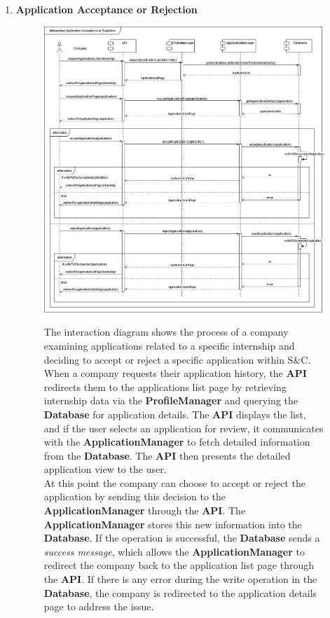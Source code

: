 \begin{enumerate}
    \newpage
    \item \textbf{Application Acceptance or Rejection}
    \begin{figure}[h!]
            \centering  \includegraphics[width=1\textwidth]{DD/Images/Interactions/INT14_ApplicationAcceptanceOrRejection.drawio.png}
            \label{fig:ComponentViewDiagram}
            \caption*{
                The interaction diagram shows the process of a company examining applications related to a specific internship and deciding to accept or reject a specific application within S\&C. When a company requests their application history, the \textbf{API} redirects them to the applications list page by retrieving internship data via the \textbf{ProfileManager} and querying the \textbf{Database} for application details. The \textbf{API} displays the list, and if the user selects an application for review, it communicates with the \textbf{ApplicationManager} to fetch detailed information from the \textbf{Database}. The \textbf{API} then presents the detailed application view to the user.
                \\At this point the company can choose to accept or reject the application by sending this decision to the \textbf{ApplicationManager} through the \textbf{API}. The \textbf{ApplicationManager} stores this new information into the \textbf{Database}. If the operation is successful, the \textbf{Database} sends a \textit{success message}, which allows the \textbf{ApplicationManager} to redirect the company back to the application list page through the \textbf{API}. 
                If there is any error during the write operation in the \textbf{Database}, the company is redirected to the application details page to address the issue.
            }
    \end{figure}
    

\end{enumerate}
